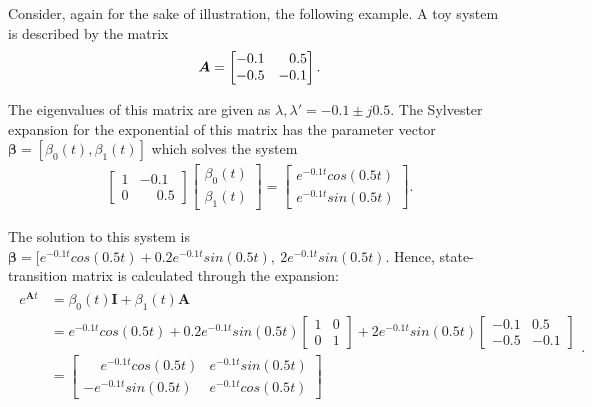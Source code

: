 \documentclass[a4paper,11pt]{book}
\numberwithin{figure}{chapter}
\numberwithin{equation}{chapter}
\numberwithin{table}{chapter}
\theoremstyle{definition}
\newtheorem{example}{Example}[chapter]
\newcounter{boxed-theorem}
\newcounter{boxed-definition}
\newcounter{boxed-example}
\newenvironment{boxed-example}[1]
{\colorlet{shadecolor}{pastelRed!20} \begin{shaded} \begin{example}{#1}}
{\end{example} \end{shaded}}
\begin{document}
\begin{boxed-example}{} \label{ex:stateTrans02}
	Consider, again for the sake of illustration, the following example. A toy system is described by the matrix
	\begin{align} \label{eq:stateRespEx02}
	    \bm{A} = \begin{bmatrix} 
	         -0.1  &  \hfill 0.5 \\
	        -0.5   &  -0.1 
	    \end{bmatrix}
	.\end{align}
	
	\noindent The eigenvalues of this matrix are given as $\lambda, \lambda' = -0.1 \pm j0.5$. The Sylvester expansion for the exponential of this matrix has the parameter vector $\bm{\beta} = [\beta_0(t), \beta_1(t)]$ which solves the system
	\begin{align}
	\begin{bmatrix}
		1 & -0.1 \\ 0 & \phantom{-} 0.5
	\end{bmatrix} \begin{bmatrix}
		\beta_0(t) \\ \beta_1(t)
	\end{bmatrix} = \begin{bmatrix}
		e^{-0.1t} cos(0.5 t) \\ e^{-0.1t} sin(0.5 t)
	\end{bmatrix}
	.\end{align}
	
	\noindent The solution to this system is $\bm{\beta} = [e^{-0.1t}cos(0.5 t) + 0.2e^{-0.1 t} sin(0.5 t),\ 2 e^{-0.1 t} sin(0.5 t)$. Hence, state-transition matrix is calculated through the expansion:
	\begin{align}
	\begin{split}
		e^{\bm{A} t} & = \beta_0(t) \bm{I} + \beta_1(t) \bm{A} \\ & = e^{-0.1t}cos(0.5 t) + 0.2e^{-0.1 t} sin(0.5 t) \begin{bmatrix} 1 & 0 \\ 0 & 1 \end{bmatrix} + 2 e^{-0.1 t} sin(0.5 t) \begin{bmatrix} -0.1  & 0.5 \\ -0.5  & -0.1 \end{bmatrix} \\
		& =  \begin{bmatrix} \phantom{-}e^{-0.1t} cos(0.5 t) & e^{-0.1t} sin(0.5 t) \\ -e^{-0.1t} sin(0.5 t) & e^{-0.1t} cos(0.5 t) \end{bmatrix} \\
	\end{split}
	.\end{align}
\end{boxed-example}
	
\end{document}
